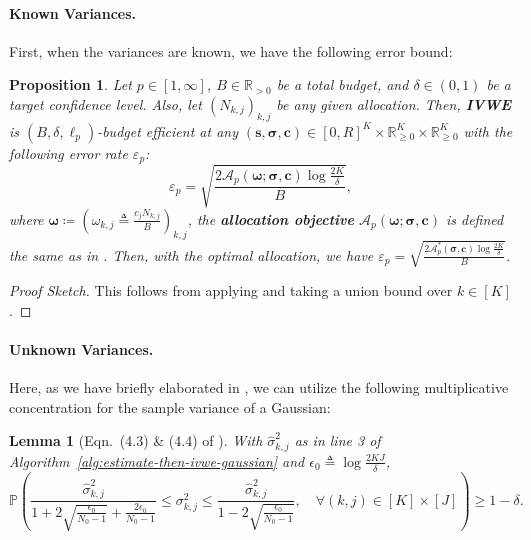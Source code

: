 \documentclass{article}
\def\vc{{\bm{c}}}
\def\vs{{\bm{s}}}
\def\gA{{\mathcal{A}}}
\def\sP{{\mathbb{P}}}
\def\sR{{\mathbb{R}}}
\theoremstyle{plain}
\newtheorem{proposition}[theorem]{Proposition}
\newtheorem{lemma}[theorem]{Lemma}
\theoremstyle{definition}
\theoremstyle{plain}
\begin{document}
\paragraph{Known Variances.}
First, when the variances are known, we have the following error bound:
\begin{proposition}
\label{prop:upper-bound-gaussian}
    Let $p \in [1, \infty]$, $B \in \sR_{> 0}$ be a total budget, and $\delta \in (0, 1)$ be a target confidence level.
    Also, let $(N_{k,j})_{k,j}$ be any given allocation.
    Then, \textbf{IVWE} is $(B, \delta, \ell_p)$-budget efficient at any $(\vs, \bm\sigma, \vc) \in [0, R]^K \times \sR^K_{\geq 0} \times \sR^K_{\geq 0}$ with the following error rate $\varepsilon_p$:
    \begin{equation}
        \varepsilon_p = \sqrt{\frac{2 \gA_p(\bm\omega; \bm\sigma, \vc) \log\frac{2K}{\delta}}{B}},
    \end{equation}
    where $\bm\omega \coloneq \left( \omega_{k,j} \triangleq \frac{c_j N_{k,j}}{B} \right)_{k,j}$, the \textbf{allocation objective} $\gA_p(\bm\omega; \bm\sigma, \vc)$ is defined the same as in .
    Then, with the optimal allocation, we have $\varepsilon_p = \sqrt{\frac{2 \gA_p^*(\bm\sigma, \vc) \log\frac{2K}{\delta}}{B}}.$
\end{proposition}
\begin{proof}[Proof Sketch]
    This follows from applying  and taking a union bound over $k \in [K]$.
\end{proof}

\paragraph{Unknown Variances.}
Here, as we have briefly elaborated in , we can utilize the following multiplicative concentration for the sample variance of a Gaussian:
\begin{lemma}[Eqn.~(4.3) \& (4.4) of \citet{laurent-massart}]
\label{lem:gaussian-variance}
    With $\hat{\sigma}_{k,j}^2$ as in line 3 of Algorithm~\ref{alg:estimate-then-ivwe-gaussian} and $\epsilon_0 \triangleq \log \frac{2KJ}{\delta}$,
    \begin{equation}
        \sP\left( \frac{\hat{\sigma}_{k,j}^2}{1 +2\sqrt{\frac{\epsilon_0 }{N_0-1}} + \frac{2\epsilon_0 }{N_0-1}} \leq \sigma_{k,j}^2 \leq \frac{\hat{\sigma}_{k,j}^2}{1 - 2\sqrt{\frac{\epsilon_0}{N_0-1}}} , \quad \forall (k, j) \in [K] \times [J] \right) \geq 1 - \delta.
    \end{equation}
\end{lemma}
\end{document}
